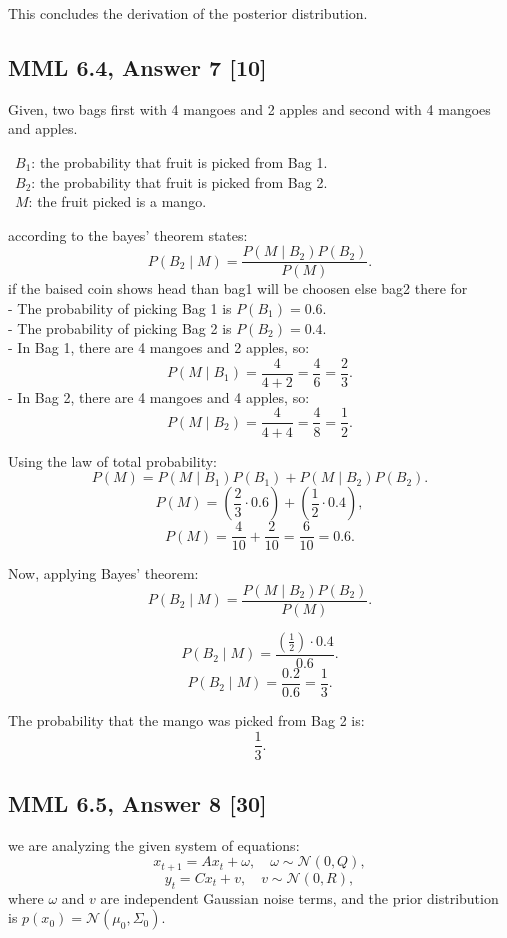 \documentclass[12pt]{article}
\begin{document}
This concludes the derivation of the posterior distribution.
\subsection*{MML 6.4, Answer 7 [10]}
Given, two bags first with 4 mangoes and 2 apples and second with 4 mangoes and apples. 
\begin{itemize}
    \ \( B_1 \): the probability that fruit is picked from Bag 1.\\
    \ \( B_2 \): the probability that fruit is picked from Bag 2.\\
    \ \( M \): the fruit picked is a mango.
\end{itemize}


according to the bayes' theorem states:
\[
P(B_2 \mid M) = \frac{P(M \mid B_2) P(B_2)}{P(M)}.
\]
if the baised coin shows head than bag1 will be choosen else bag2 there for\\
   - The probability of picking Bag 1 is \( P(B_1) = 0.6 \).\\
   - The probability of picking Bag 2 is \( P(B_2) = 0.4 \).
\\
   - In Bag 1, there are 4 mangoes and 2 apples, so:
   \[
   P(M \mid B_1) = \frac{4}{4 + 2} = \frac{4}{6} = \frac{2}{3}.
   \]
   - In Bag 2, there are 4 mangoes and 4 apples, so:
   \[
   P(M \mid B_2) = \frac{4}{4 + 4} = \frac{4}{8} = \frac{1}{2}.
   \]

   Using the law of total probability:
   \[
   P(M) = P(M \mid B_1) P(B_1) + P(M \mid B_2) P(B_2).
   \]
   \[
   P(M) = \left(\frac{2}{3} \cdot 0.6\right) + \left(\frac{1}{2} \cdot 0.4\right),
   \]
   \[
   P(M) = \frac{4}{10} + \frac{2}{10} = \frac{6}{10} = 0.6.
   \]

Now, applying Bayes' theorem:
\[
P(B_2 \mid M) = \frac{P(M \mid B_2) P(B_2)}{P(M)}.
\]

\[
P(B_2 \mid M) = \frac{\left(\frac{1}{2}\right) \cdot 0.4}{0.6}.
\]
\[
P(B_2 \mid M) = \frac{0.2}{0.6} = \frac{1}{3}.
\]

The probability that the mango was picked from Bag 2 is:
\[
\boxed{\frac{1}{3}}.
\]

\subsection*{MML 6.5, Answer 8 [30]}
we are analyzing the given system of equations:
\[
x_{t+1} = A x_t + \omega, \quad \omega \sim \mathcal{N}(0, Q),
\]
\[
y_t = C x_t + v, \quad v \sim \mathcal{N}(0, R),
\]
where \( \omega \) and \( v \) are independent Gaussian noise terms, and the prior distribution is \( p(x_0) = \mathcal{N}(\mu_0, \Sigma_0) \).
\end{document}
